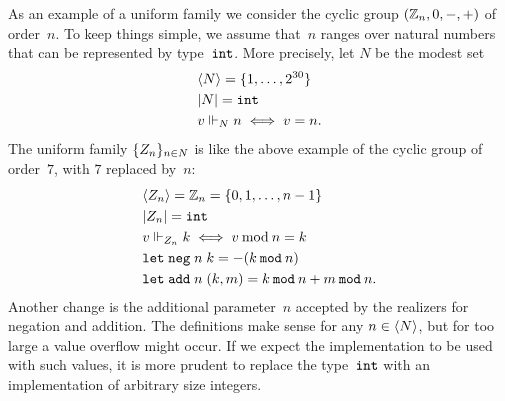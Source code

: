 As an example of a uniform family we consider the cyclic group
$(\mathbb{Z}_n, 0, {-}, {+})$ of order~$n$. To keep things simple, we assume
that~$n$ ranges over natural numbers that can be represented by
type~$\mathtt{int}$. More precisely, let $N$ be the modest set
%
\begin{align*}
  & \langle N \rangle = \{1, \ldots, 2^{30}\} \\
  & |N| = \mathtt{int} \\
  & v \Vdash_N n \iff v = n.
\end{align*}
%
The uniform family $\{Z_n\}_{n \in N}$ is like the above example
of the cyclic group of order~$7$, with $7$ replaced by~$n$:
%
\begin{align*}
  & \langle Z_n \rangle = \mathbb{Z}_n = \{0, 1, \ldots, n - 1\}
  \\
  & |Z_n| = \mathtt{int}
  \\
  & v \Vdash_{Z_n} k \iff v \mathbin{\mathrm{mod}} n = k
  \\
  & \mathtt{let}\;\mathtt{neg} \; n \; k  = - (k \mathbin{\mathtt{mod}} n)
  \\
  & \mathtt{let}\;\mathtt{add} \; n \; (k,m) = k \mathbin{\mathtt{mod}} n + m \mathbin{\mathtt{mod}} n.
\end{align*}
%
Another change is the additional parameter~$n$ accepted by the
realizers for negation and addition. The definitions make sense for
any $n \in \langle N \rangle$, but for too large a value overflow might occur.
If we expect the implementation to be used with such values, it is
more prudent to replace the type~$\mathtt{int}$ with an implementation of
arbitrary size integers.


